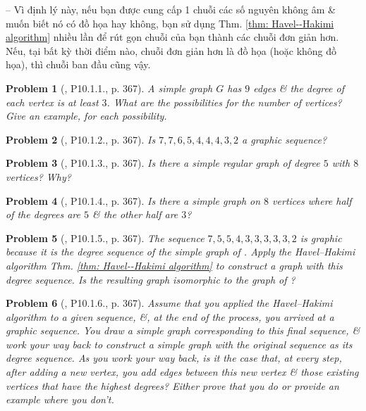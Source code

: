 \documentclass[oneside]{book}
\newtheorem{problem}{Problem}
\begin{document}
-- Vì định lý này, nếu bạn được cung cấp 1 chuỗi các số nguyên không âm \& muốn biết nó có đồ họa hay không, bạn sử dụng Thm. \ref{thm: Havel--Hakimi algorithm} nhiều lần để rút gọn chuỗi của bạn thành các chuỗi đơn giản hơn. Nếu, tại bất kỳ thời điểm nào, chuỗi đơn giản hơn là đồ họa (hoặc không đồ họa), thì chuỗi ban đầu cũng vậy.

\begin{problem}[\cite{Shahriari2022}, P10.1.1., p. 367]
	A simple graph $G$ has $9$ edges \& the degree of each vertex is at least $3$. What are the possibilities for the number of vertices? Give an example, for each possibility.
\end{problem}

\begin{problem}[\cite{Shahriari2022}, P10.1.2., p. 367]
	Is $7,7,6,5,4,4,4,3,2$ a graphic sequence?
\end{problem}

\begin{problem}[\cite{Shahriari2022}, P10.1.3., p. 367]
	Is there a simple regular graph of degree $5$ with $8$ vertices? Why?
\end{problem}

\begin{problem}[\cite{Shahriari2022}, P10.1.4., p. 367]
	Is there a simple graph on $8$ vertices where half of the degrees are $5$ \& the other half are $3$?
\end{problem}

\begin{problem}[\cite{Shahriari2022}, P10.1.5., p. 367]
	The sequence $7,5,5,4,3,3,3,3,3,2$ is graphic because it is the degree sequence of the simple graph of \cite[Fig. 10.1]{Shahriari2022}. Apply the Havel--Hakimi algorithm Thm. \ref{thm: Havel--Hakimi algorithm} to construct a graph with this degree sequence. Is the resulting graph isomorphic to the graph of \cite[Fig. 10.1]{Shahriari2022}?
\end{problem}

\begin{problem}[\cite{Shahriari2022}, P10.1.6., p. 367]
	Assume that you applied the Havel--Hakimi algorithm to a given sequence, \&, at the end of the process, you arrived at a graphic sequence. You draw a simple graph corresponding to this final sequence, \& work your way back to construct a simple graph with the original sequence as its degree sequence. As you work your way back, is it the case that, at every step, after adding a new vertex, you add edges between this new vertex \& those existing vertices that have the highest degrees? Either prove that you do or provide an example where you don't.
\end{problem}
\end{document}
